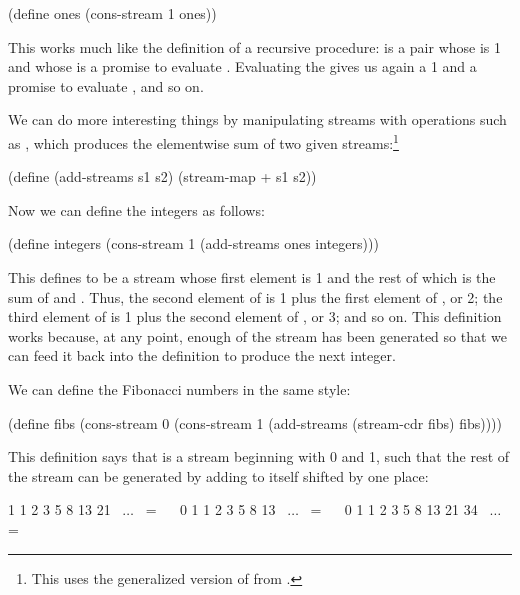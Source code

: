 \begin{codeBlock}
(define ones (cons-stream 1 ones))
\end{codeBlock}

\noindent
This works much like the definition of a recursive procedure:  is a
pair whose  is 1 and whose  is a promise to evaluate
.  Evaluating the  gives us again a 1 and a promise to
evaluate , and so on.

We can do more interesting things by manipulating streams with operations such
as , which produces the elementwise sum of two given
streams:\footnote{This uses the generalized version of  from
.}

\begin{codeBlock}
(define (add-streams s1 s2) (stream-map + s1 s2))
\end{codeBlock}

\noindent
Now we can define the integers as follows:

\begin{codeBlock}
(define integers
  (cons-stream 1 (add-streams ones integers)))
\end{codeBlock}

\noindent
This defines  to be a stream whose first element is 1 and the
rest of which is the sum of  and .  Thus, the second
element of  is 1 plus the first element of , or
2; the third element of  is 1 plus the second element of
, or 3; and so on.  This definition works because, at any point,
enough of the  stream has been generated so that we can feed it
back into the definition to produce the next integer.

We can define the Fibonacci numbers in the same style:

\begin{codeBlock}
(define fibs
  (cons-stream
    0
    (cons-stream 1
                 (add-streams (stream-cdr fibs)
                              fibs))))
\end{codeBlock}

\noindent
This definition says that  is a stream beginning with 0 and 1, such
that the rest of the stream can be generated by adding  to itself
shifted by one place:

\begin{codeBlock}
      1  1  2  3  5  8   13  21  ~\( \dots \)~  =  ~~
      0  1  1  2  3  5   8   13  ~\( \dots \)~  =  ~~
0  1  1  2  3  5  8  13  21  34  ~\( \dots \)~  =  ~~
\end{codeBlock}

